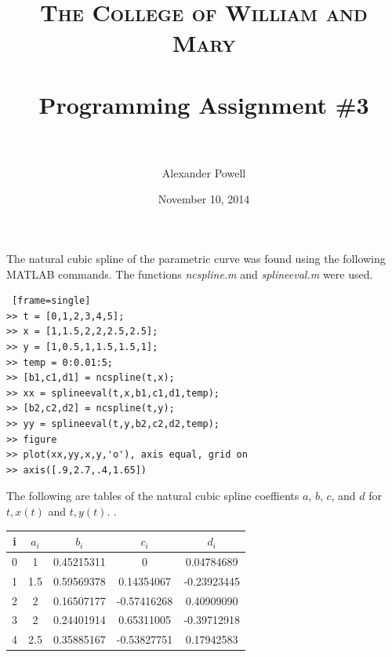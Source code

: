 \documentclass[paper=a4, fontsize=11pt]{scrartcl} %
\title{	
\normalfont \normalsize 
\textsc{The College of William and Mary} \\ [25pt] %
\horrule{0.5pt} \\[0.4cm] %
\huge Programming Assignment \#3 \\ %
\horrule{2pt} \\[0.5cm] %
}
\author{Alexander Powell} %
\date{\normalsize November 10, 2014} %
\numberwithin{equation}{section} %
\numberwithin{figure}{section} %
\numberwithin{table}{section} %
\begin{document}
\lstset{language=MATLAB}

\maketitle %


\section{}

The natural cubic spline of the parametric curve was found using the following MATLAB commands.  The functions {\textit{ncspline.m}} and {\textit{splineeval.m}} were used.  

\begin{lstlisting} [frame=single]
>> t = [0,1,2,3,4,5];
>> x = [1,1.5,2,2,2.5,2.5];
>> y = [1,0.5,1,1.5,1.5,1];
>> temp = 0:0.01:5;
>> [b1,c1,d1] = ncspline(t,x);
>> xx = splineeval(t,x,b1,c1,d1,temp);
>> [b2,c2,d2] = ncspline(t,y);
>> yy = splineeval(t,y,b2,c2,d2,temp);
>> figure
>> plot(xx,yy,x,y,'o'), axis equal, grid on
>> axis([.9,2.7,.4,1.65])
\end{lstlisting}

The following are tables of the natural cubic spline coeffients $a$, $b$, $c$, and $d$ for $t,x(t)$ and $t,y(t)$.  .  

\begin{center}
  \begin{tabular}{ c || c | c | c | c }
    i & $a_i$ & $b_i$ & $c_i$ & $d_i$\\ \hline
    0 & 1   & 0.45215311 & 0          & 0.04784689 \\ \hline
    1 & 1.5 & 0.59569378 & 0.14354067 &-0.23923445 \\ \hline
    2 & 2   & 0.16507177 &-0.57416268 & 0.40909090 \\ \hline
    3 & 2   & 0.24401914 & 0.65311005 &-0.39712918 \\ \hline
    4 & 2.5 & 0.35885167 &-0.53827751 & 0.17942583 \\
    \hline
  \end{tabular}
\end{center}
\end{document}
